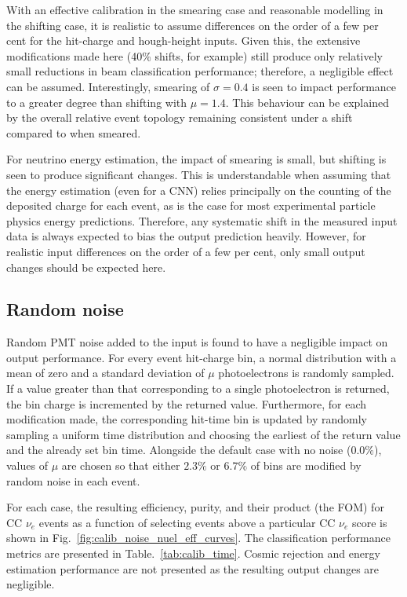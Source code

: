 With an effective calibration in the smearing case and reasonable modelling in the shifting case,
it is realistic to assume differences on the order of a few per cent for the hit-charge and
hough-height inputs. Given this, the extensive modifications made here (40\% shifts, for example)
still produce only relatively small reductions in beam classification performance; therefore, a
negligible effect can be assumed. Interestingly, smearing of $\sigma=0.4$ is seen to impact
performance to a greater degree than shifting with $\mu=1.4$. This behaviour can be explained by
the overall relative event topology remaining consistent under a shift compared to when smeared.

For neutrino energy estimation, the impact of smearing is small, but shifting is seen to produce
significant changes. This is understandable when assuming that the energy estimation (even for a
CNN) relies principally on the counting of the deposited charge for each event, as is the case for
most experimental particle physics energy predictions. Therefore, any systematic shift in the
measured input data is always expected to bias the output prediction heavily. However, for
realistic input differences on the order of a few per cent, only small output changes should be
expected here.

\subsection{Random noise} %
\label{sec:results_robust_noise} %

Random PMT noise added to the input is found to have a negligible impact on output performance.
For every event hit-charge bin, a normal distribution with a mean of zero and a standard deviation
of $\mu$ photoelectrons is randomly sampled. If a value greater than that corresponding to a
single photoelectron is returned, the bin charge is incremented by the returned value.
Furthermore, for each modification made, the corresponding hit-time bin is updated by randomly
sampling a uniform time distribution and choosing the earliest of the return value and the already
set bin time. Alongside the default case with no noise ($0.0\%$), values of $\mu$ are chosen so
that either $2.3\%$ or $6.7\%$ of bins are modified by random noise in each event.

For each case, the resulting efficiency, purity, and their product (the FOM) for CC $\nu_{e}$
events as a function of selecting events above a particular CC $\nu_{e}$ score is shown in
Fig.~\ref{fig:calib_noise_nuel_eff_curves}. The classification performance metrics are presented
in Table.~\ref{tab:calib_time}. Cosmic rejection and energy estimation performance are not
presented as the resulting output changes are negligible.

